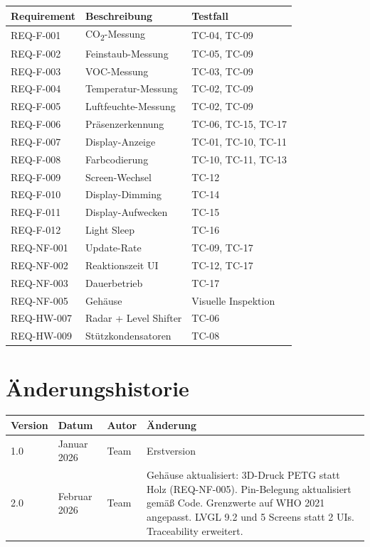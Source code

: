 \documentclass[a4paper,11pt]{article}
\begin{document}
\begin{tabularx}{\textwidth}{llX}
\toprule
\rowcolor{tableheader}
\textbf{Requirement} & \textbf{Beschreibung} & \textbf{Testfall} \\
\midrule
REQ-F-001 & CO\textsubscript{2}-Messung & TC-04, TC-09 \\
REQ-F-002 & Feinstaub-Messung & TC-05, TC-09 \\
REQ-F-003 & VOC-Messung & TC-03, TC-09 \\
REQ-F-004 & Temperatur-Messung & TC-02, TC-09 \\
REQ-F-005 & Luftfeuchte-Messung & TC-02, TC-09 \\
REQ-F-006 & Präsenzerkennung & TC-06, TC-15, TC-17 \\
REQ-F-007 & Display-Anzeige & TC-01, TC-10, TC-11 \\
REQ-F-008 & Farbcodierung & TC-10, TC-11, TC-13 \\
REQ-F-009 & Screen-Wechsel & TC-12 \\
REQ-F-010 & Display-Dimming & TC-14 \\
REQ-F-011 & Display-Aufwecken & TC-15 \\
REQ-F-012 & Light Sleep & TC-16 \\
REQ-NF-001 & Update-Rate & TC-09, TC-17 \\
REQ-NF-002 & Reaktionszeit UI & TC-12, TC-17 \\
REQ-NF-003 & Dauerbetrieb & TC-17 \\
REQ-NF-005 & Gehäuse & Visuelle Inspektion \\
REQ-HW-007 & Radar + Level Shifter & TC-06 \\
REQ-HW-009 & Stützkondensatoren & TC-08 \\
\bottomrule
\end{tabularx}

\section{Änderungshistorie}

\begin{tabularx}{\textwidth}{l l l X}
\toprule
\rowcolor{tableheader}
\textbf{Version} & \textbf{Datum} & \textbf{Autor} & \textbf{Änderung} \\
\midrule
1.0 & Januar 2026  & Team & Erstversion \\
2.0 & Februar 2026 & Team & Gehäuse aktualisiert: 3D-Druck PETG statt Holz (REQ-NF-005). Pin-Belegung aktualisiert gemäß Code. Grenzwerte auf WHO 2021 angepasst. LVGL 9.2 und 5 Screens statt 2 UIs. Traceability erweitert. \\
\bottomrule
\end{tabularx}
\end{document}
